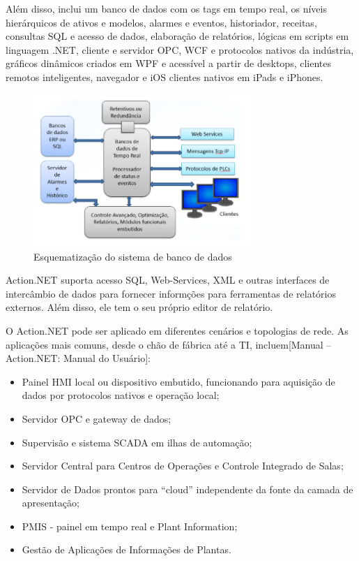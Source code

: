 Além disso, inclui um banco de dados com os tags em tempo real, os níveis hierárquicos de ativos e modelos, alarmes e eventos, historiador, receitas, consultas SQL e acesso de dados, elaboração de relatórios, lógicas em scripts em linguagem .NET, cliente e servidor OPC, WCF e protocolos nativos da indústria, gráficos dinâmicos criados em WPF e acessível a partir de desktops, clientes remotos inteligentes, navegador e iOS clientes nativos em iPads e iPhones.
\begin{figure}[!h]
	\centering
	\includegraphics[width=0.75\textwidth]{figuras/bancoDados.png}
	\caption{Esquematização do sistema de banco de dados}
	\label{fig:bancodados}
\end{figure}

Action.NET suporta acesso SQL, Web-Services, XML e outras interfaces de intercâmbio de dados para fornecer informções para ferramentas de relatórios externos. Além disso, ele tem o seu próprio editor de relatório.

O Action.NET pode ser aplicado em diferentes cenários e topologias de rede. As aplicações mais comuns, desde o chão de fábrica até a TI, incluem[Manual – Action.NET: Manual do Usuário]:
\begin{itemize}
\item Painel HMI local ou dispositivo embutido, funcionando para aquisição de dados por protocolos nativos e operação local;
\item Servidor OPC e gateway de dados;
\item Supervisão e sistema SCADA em ilhas de automação;
\item Servidor Central para Centros de Operações e Controle Integrado de Salas;
\item Servidor de Dados prontos para “cloud” independente da fonte da camada de apresentação;
\item PMIS - painel em tempo real e Plant Information; 
\item Gestão de Aplicações de Informações de Plantas.
\end{itemize}

